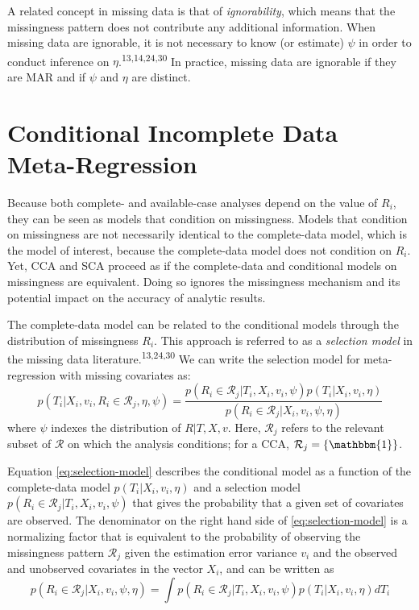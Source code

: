 \documentclass[
]{article}
\begin{document}
A related concept in missing data is that of \emph{ignorability}, which means that the missingness pattern does not contribute any additional information.
When missing data are ignorable, it is not necessary to know (or estimate) \(\psi\) in order to conduct inference on \(\eta\).\textsuperscript{13,14,24,30}
In practice, missing data are ignorable if they are MAR and if \(\psi\) and \(\eta\) are distinct.

\hypertarget{conditional-incomplete-data-meta-regression}{%
\section{Conditional Incomplete Data Meta-Regression}\label{conditional-incomplete-data-meta-regression}}

Because both complete- and available-case analyses depend on the value of \(R_i\), they can be seen as models that condition on missingness.
Models that condition on missingness are not necessarily identical to the complete-data model, which is the model of interest, because the complete-data model does not condition on \(R_i\).
Yet, CCA and SCA proceed as if the complete-data and conditional models on missingness are equivalent.
Doing so ignores the missingness mechanism and its potential impact on the accuracy of analytic results.

The complete-data model can be related to the conditional models through the distribution of missingness \(R_i\).
This approach is referred to as a \emph{selection model} in the missing data literature.\textsuperscript{13,24,30}
We can write the selection model for meta-regression with missing covariates as:
\begin{equation}
p(T_i | X_i, v_i, R_i \in \mathcal{R}_j, \eta, \psi) 
  = \frac{p(R_i \in \mathcal{R}_j | T_i, X_i, v_i, \psi)p(T_i | X_i, v_i, \eta)}{p(R_i \in \mathcal{R}_j | X_i, v_i, \psi, \eta)} 
\label{eq:selection-model}
\end{equation}
where \(\psi\) indexes the distribution of \(R | T, X, v\).
Here, \(\mathcal{R}_j\) refers to the relevant subset of \(\mathcal{R}\) on which the analysis conditions; for a CCA, \(\mathcal{R}_j = \{\mathbbm{1}\}\).

Equation \eqref{eq:selection-model} describes the conditional model as a function of the complete-data model \(p(T_i | X_i, v_i, \eta)\) and a selection model \(p(R_i \in \mathcal{R}_j | T_i, X_i, v_i, \psi)\) that gives the probability that a given set of covariates are observed.
The denominator on the right hand side of \eqref{eq:selection-model} is a normalizing factor that is equivalent to the probability of observing the missingness pattern \(\mathcal{R}_j\) given the estimation error variance \(v_i\) and the observed and unobserved covariates in the vector \(X_i\), and can be written as
\begin{equation}
p(R_i \in \mathcal{R}_j | X_i, v_i, \psi, \eta) = \int p(R_i \in \mathcal{R}_j | T_i, X_i, v_i, \psi)p(T_i | X_i, v_i, \eta) dT_i
\label{eq:pr-xv}
\end{equation}
\end{document}
